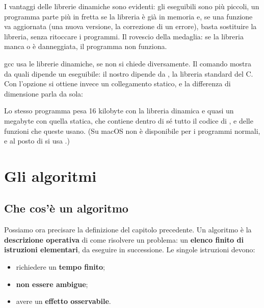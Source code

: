 I vantaggi delle librerie dinamiche sono evidenti: gli eseguibili sono più
piccoli, un programma parte più in fretta se la libreria è già in memoria e,
se una funzione va aggiornata (una nuova versione, la correzione di un
errore), basta sostituire la libreria, senza ritoccare i programmi. Il
rovescio della medaglia: se la libreria manca o è danneggiata, il programma
non funziona.

gcc usa le librerie dinamiche, se non si chiede diversamente. Il comando
 mostra da quali dipende un eseguibile: il nostro dipende da
, la libreria standard del C. Con l'opzione 
si ottiene invece un collegamento statico, e la differenza di dimensione
parla da sola:


Lo stesso programma pesa 16 kilobyte con la libreria dinamica e quasi un
megabyte con quella statica, che contiene dentro di sé tutto il codice di
,  e delle funzioni che queste usano. (Su macOS
 non è disponibile per i programmi normali, e al posto di
 si usa .)

\section{Gli algoritmi}

\subsection{Che cos'è un algoritmo}

Possiamo ora precisare la definizione del capitolo precedente. Un
algoritmo è la \textbf{descrizione operativa} di come risolvere un problema:
un \textbf{elenco finito di istruzioni elementari}, da eseguire in
successione. Le singole istruzioni devono:

\begin{itemize}
  \item richiedere un \textbf{tempo finito};
  \item \textbf{non essere ambigue};
  \item avere un \textbf{effetto osservabile}.
\end{itemize}

